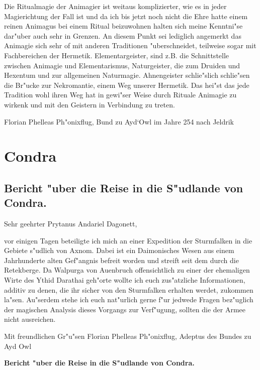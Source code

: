 \documentclass[a5paper,8pt]{book}
\begin{document}
Die Ritualmagie der Animagier ist weitaus komplizierter, wie es in jeder Magierichtung der Fall ist und da ich bis jetzt noch nicht die Ehre hatte einem reinen Animagus bei einem Ritual beizuwohnen halten sich meine Kenntni"se dar"uber auch sehr in Grenzen. An diesem Punkt sei lediglich angemerkt das Animagie sich sehr of mit anderen Traditionen "uberschneidet, teilweise sogar mit Fachbereichen der Hermetik. Elementargeister, sind z.B. die Schnittstelle zwischen Animagie und Elementarismus, Naturgeister, die zum Druiden und Hexentum und zur allgemeinen Naturmagie. Ahnengeister schlie"slich schlie"sen die Br"ucke zur Nekromantie, einem Weg unserer Hermetik. Das hei"st das jede Tradition wohl ihren Weg hat in gewi"ser Weise durch Rituale Animagie zu wirkenk und mit den Geistern in Verbindung zu treten.

\vspace{10mm}

Florian Phelleas Ph"onixflug, Bund zu Ayd`Owl im Jahre 254 nach Jeldrik

\newpage


\chapter{ Condra}

\section{ Bericht "uber die Reise in die S"udlande von Condra.}

Sehr geehrter Prytanus Andariel Dagonett,

vor einigen Tagen beteiligte ich mich an einer Expedition der Sturmfalken in die Gebiete s"udlich von Axnom. Dabei ist ein Daimonisches Wesen aus einem Jahrhunderte alten Gef"angnis befreit worden und streift seit dem durch die Retekberge. Da Walpurga von Auenbruch offensichtlich zu einer der ehemaligen Wirte des Ythid Darathai geh"orte wollte ich euch zus"atzliche Informationen, additiv zu denen, die ihr sicher von den Sturmfalken erhalten werdet, zukommen la"sen. Au"serdem stehe ich euch nat"urlich gerne f"ur jedwede Fragen bez"uglich der magischen Analysis dieses Vorgangs zur Verf"ugung, sollten die der Armee nicht ausreichen.

Mit freundlichen Gr"u"sen
Florian Phelleas Ph"onixflug, Adeptus des Bundes zu Ayd Owl

\newpage

\textbf{Bericht "uber die Reise in die S"udlande von Condra.}\\
\end{document}
